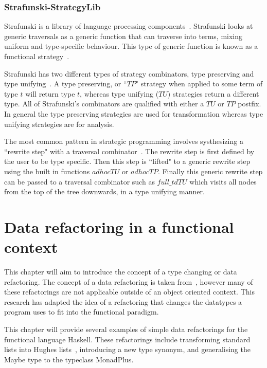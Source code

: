 \subsection{Strafunski-StrategyLib}\label{strafunskiSection}
Strafunski is a library of language processing components~\citep{strafunski}. Strafunski looks at generic traversals as a generic function that can traverse into terms, mixing uniform and type-specific behaviour. This type of generic function is known as a functional strategy~\citep{strafunski}.

Strafunski has two different types of strategy combinators, type preserving and type unifying~\citep{strafunski}. A type preserving, or ``$TP$" strategy when applied to some term of type $t$ will return type $t$, whereas type unifying ($TU$) strategies return a different type. All of Strafunski's combinators are qualified with either a $TU$ or $TP$ postfix. In general the type preserving strategies are used for transformation whereas type unifying strategies are for analysis. 

The most common pattern in strategic programming involves systhesizing a ``rewrite step" with a traversal combinator~\citep{strafunski}. The rewrite step is first defined by the user to be type specific. Then this step is ``lifted" to a generic rewrite step using the built in functions $adhocTU$ or $adhocTP$. Finally this generic rewrite step can be passed to a traversal combinator such as $full\_tdTU$ which visits all nodes from the top of the tree downwards, in a type unifying manner.




\chapter{Data refactoring in a functional context}
This chapter will aim to introduce the concept of a type changing or data refactoring. The concept of a data refactoring is taken from~\cite{fowler}, however many of these refactorings are not applicable outside of an object oriented context. This research has adapted the idea of a refactoring that changes the datatypes a program uses to fit into the functional paradigm.

This chapter will provide several examples of simple data refactorings for the functional language Haskell. These refactorings include transforming standard lists into Hughes lists~\citep{hughesList}, introducing a new type synonym, and generalising the Maybe type to the typeclass MonadPlus. 

